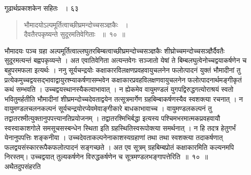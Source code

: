 \documentclass[11pt, openany]{book}
\begin{document}
\hspace{3cm}गूढार्थप्रकाशकेन सहितः ~। \hfill ६३
\vspace{1cm}
\begin{quote}

{\ssi भौमादयोऽल्पमूर्तित्वाच्छीघ्रमन्दोच्चसञ्ज्ञकैः ~।\\
दैवतैरपकृष्यन्ते सुदूरमतिवेगिताः ~॥~१०~॥}
\end{quote}
\begin{sloppypar}
भौमादयः पञ्च ग्रहा अल्पमूर्तित्वाल्लघुतरबिम्बत्वाच्छीघ्रमन्दोच्चसञ्ज्ञकैः शीघ्रोच्चमन्दोच्चसञ्ज्ञैर्दैवतैः सुदूरमत्यन्तं बह्वपकृव्यन्ते । अत एवातिवेगिता अत्यन्तवेगः सञ्जातो येषां ते बिम्बलघुत्वेनोच्चद्वयाकर्षणेन च बहुपरमफला इत्यर्थः । ननु सूर्यचन्द्रयोः कक्षाकारविलक्षणप्रवहवायुचलनेन फलोत्पादनं युक्तं भौमादीनां तु प्रत्येकमुच्चद्वयसद्भावाद्वायुरश्म्याकर्षणासम्भवेन कक्षाकारप्रवहविलक्षणवायुचलनेन फलोत्पादनार्थमङ्गीकृतं कथं सम्भवति । उच्चद्वयस्थानस्यैकत्वाभावात् । न ह्येकमेव वायुमण्डलं युगपद्विरुद्धगत्योराश्रयं स्वतो भवितुमर्हतीति भौमादीनां शीघ्रमन्दोच्चदेवताद्वयेन तत्सूत्रमार्गेण ग्रहबिम्बाकर्षणस्यैव स्वशक्त्या रचनात् । न वायुमण्डलचलनकल्पनं सूर्यचन्द्रयोरप्येवमेवाङ्गीकारे बाधकाभावाच्च । वायुमण्डलकल्पनं तु तद्वातरश्मीत्युक्तानुपपत्त्यानतिप्रयोजनम् । तद्वातरश्मिभिर्बद्धा इत्यस्य पश्चिमभरमात्मकप्रवहवायौ स्वस्वाकाशगोले समसूचसस्बन्धेन स्थिता इति ग्रहस्थितिस्वरूपोक्त्या समर्थनात् । न हि तदत्र हेतुगर्भं येनानुपपत्तिः शङ्कनीया । उच्चदेवताकल्पनेनाकाशस्यग्रहाणां तथा तथा स्वशक्त्या तदाकर्षणात् फलद्वयसंस्काररूपैकफलोत्पादनं सङ्गच्छते । अत एव सूत्रम् ग्रहबिम्बप्रोतं कक्षाकारमिति कल्यनमपि निरस्तम्। उच्चद्वयात् तुल्यकर्षणेन विरुद्धकर्षणेन च सूत्रमण्डलभङ्गापत्तेरिति~॥~१०~॥\\
\noindent अथैतदुपसंहरति \textendash
\end{sloppypar}
\end{document}
